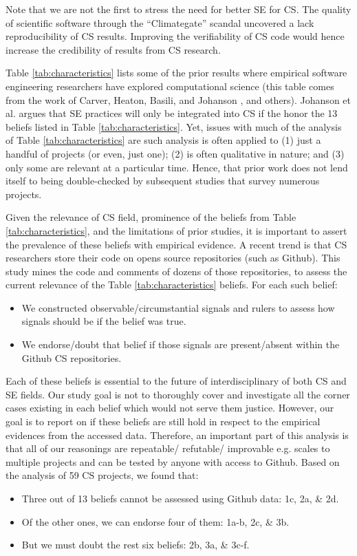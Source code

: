 \documentclass[sigconf,review,anonymous]{acmart}
\newcommand{\bi}{\begin{itemize}}
\newcommand{\ei}{\end{itemize}}
\begin{document}
 
 Note that we are not the first to stress the need for better SE for CS. The quality of scientific software through the ``Climategate'' scandal \cite{merali10_error} uncovered a lack reproducibility of CS results. Improving the verifiability of CS code would hence increase the   credibility of results from  CS research. 




Table \ref{tab:characteristics}
lists some of the prior results
where empirical software
engineering researchers have explored computational science
(this table comes from the work of
Carver, Heaton, Basili, and Johanson \cite{carver13_perception, carver07_environment, basili08_hpc, heaton15_lit, johan18_secs}, and others).
Johanson et al. \cite{johan18_secs}   argues that SE practices will only be integrated into CS if the honor the 13 beliefs listed in
Table \ref{tab:characteristics}. Yet, issues with much of the analysis of Table \ref{tab:characteristics} are such analysis is often applied to (1) just a handful of projects (or even, just one); (2) is often qualitative in nature; and (3) only some are relevant at a particular time. Hence, that prior work does not lend itself to being double-checked by subsequent studies that survey numerous projects. 


Given the relevance of CS field, prominence of the beliefs
from Table \ref{tab:characteristics}, and the limitations of prior studies, it is important to assert the prevalence of these beliefs with empirical evidence. A recent trend is that CS researchers store their code on opens source repositories (such as Github). This study mines the code and comments of dozens of those repositories, to assess the current relevance of the Table \ref{tab:characteristics} beliefs. 
 For each such belief:
\bi
\item We constructed observable/circumstantial signals and rulers to assess how signals should be if the belief was true.   
\item We endorse/doubt that belief if those signals are present/absent within the Github CS repositories.
\ei

Each of these beliefs is essential to the future of interdisciplinary of both CS and SE fields. Our study goal is not to thoroughly cover and investigate all the corner cases existing in each belief which would not serve them justice. However, our goal is to report on if these beliefs are still hold in respect to the empirical evidences from the accessed data. Therefore, an important part of this analysis is that all of our reasonings are repeatable/ refutable/ improvable e.g. scales to multiple projects and can be tested by anyone with access to Github.
Based on the analysis of 59 CS projects, we found that:
\bi
\item Three out of 13 beliefs cannot be assessed using Github data: 1c, 2a, \& 2d. 
\item Of the other ones, we can endorse four of them:  1a-b, 2c, \& 3b.
\item But we must doubt the rest six beliefs: 2b, 3a, \& 3c-f. 
\ei
\end{document}
